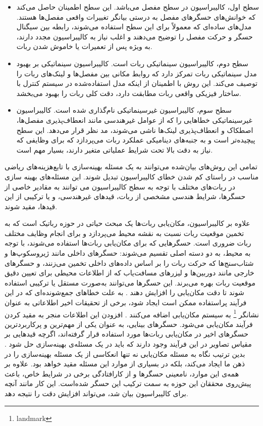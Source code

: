 \begin{itemize}
	\item سطح اول، کالیبراسیون در سطح مفصل می‌باشد. این سطح اطمینان حاصل می‌کند که خوانش‌های حسگرهای مفصل به درستی بیانگر تغییرات واقعی مفصل‌ها هستند. مدل‌های ساده‌ای که معمولاً برای این سطح استفاده می‌شوند، رابطه بین سیگنال حسگر و حرکت مفصل را توضیح می‌دهند و اغلب نیاز به کالیبراسیون مجدد دارند، به ویژه پس از تعمیرات یا خاموش شدن ربات.
	
	
	\item  سطح دوم، کالیبراسیون سینماتیکی ربات است. کالیبراسیون سینماتیکی بر بهبود مدل سینماتیکی ربات تمرکز دارد که روابط مکانی بین مفصل‌ها و لینک‌های ربات را توصیف می‌کند. این روش با اطمینان از اینکه مدل استفاده‌شده در سیستم کنترل با ساختار فیزیکی واقعی ربات مطابقت دارد، دقت کلی ربات را بهبود می‌بخشد. 
	
	
	\item  سطح سوم، کالیبراسیون غیرسینماتیکی نام‌گذاری شده است. کالیبراسیون غیرسینماتیکی خطاهایی را که از عوامل غیرهندسی مانند انعطاف‌پذیری مفصل‌ها، اصطکاک و انعطاف‌پذیری لینک‌ها ناشی می‌شوند، مد نظر قرار می‌دهد. این سطح پیچیده‌تر است و به جنبه‌های دینامیکی عملکرد ربات می‌پردازد که برای وظایفی که نیاز به دقت بالا تحت شرایط عملیاتی متغیر دارند، بسیار مهم است.
	
	
\end{itemize}
تمامی این روش‌های بیان‌شده می‌توانند به یک مسئله‌‌ بهینه‌سازی با تابع‌هزینه‌های ریاضی مناسب در راستای کم شدن خطای کالیبراسیون تبدیل شوند. این مسئله‌های بهینه سازی در ربات‌های مختلف با توجه به سطح کالیبراسیون می توانند به مقادیر خاصی از حسگرها، شرایط هندسی مشخصی از ربات، قیدهای غیرهندسی، و یا ترکیبی از این قیدها، مقید شوند. 

علاوه بر کالیبراسیون، مکان‌یابی ربات‌ها یک مبحث حیاتی در حوزه رباتیک است که به تخمین موقعیت ربات نسبت به نقشه محیط می‌پردازد و برای انجام وظایف مختلف ربات ضروری است. حسگرهایی که برای مکان‌یابی ربات‌ها استفاده می‌شوند، با توجه به محیط، به دو دسته اصلی تقسیم می‌شوند: حسگرهای داخلی مانند ژیروسکوپ‌ها و شتاب‌سنج‌ها که حرکت ربات را بر اساس داده‌های داخلی تخمین می‌زنند، و حسگرهای خارجی مانند دوربین‌ها و لیزرهای مسافت‌یاب که از اطلاعات محیطی برای تعیین دقیق موقعیت ربات بهره می‌برند. این حسگرها می‌توانند به‌صورت مستقل یا ترکیبی استفاده شوند تا دقت مکان‌یابی را افزایش دهند
\cite{malagon2015mobile, burgard1997active}.
به علت خطاهای جمع‌شونده‌ای که در این فرآیند پراستفاده ممکن است ایجاد شود، برخی از تحقیقات اخیر اطلاعاتی به عنوان نشانگر
\footnote{landmark}
به سیستم مکان‌یابی اضافه می‌کنند
\cite{betke1997mobile}.
افزودن این اطلاعات منجر به مقید کردن فرآیند مکان‌یابی می‌شود. حسگر‌های بینایی، به عنوان یکی از مهم‌ترین و پرکاربردترین حسگر‌های اخیر در مکان‌یابی ربات‌ها مورد استفاده قرار گرفته‌اند، اگرچه قید‌هایی بر مقیاس تصاویر در این فرآیند وجود دارند که باید در یک مسئله‌ی بهینه‌سازی حل شود
\cite{Forster2014ICRA}.
 بدین ترتیب نگاه به مسئله مکان‌یابی نه تنها انعکاسی از یک مسئله بهینه‌سازی را در ذهن ما ایجاد می‌کند، بلکه در بسیاری از موارد این مسئله مقید خواهد بود. علاوه بر همه‌ی این موارد، نامعینی‌ حسگر‌ها و از کارافتادگی برخی در شرایط خاص، باعث پیش‌روی محققان این حوزه به سمت ترکیب این حسگر شده‌است. این کار مانند آنچه برای کالیبراسیون بیان شد، می‌تواند افزایش دقت را نتیجه دهد. 
 

